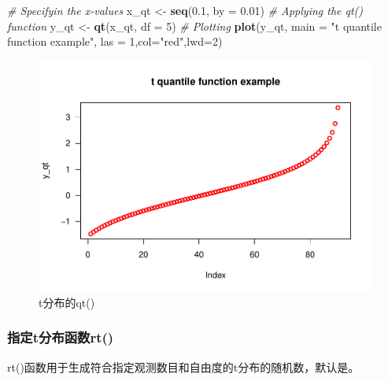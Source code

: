 \documentclass[
]{article}
\newenvironment{Shaded}{\begin{snugshade}}{\end{snugshade}}
\newcommand{\CommentTok}[1]{\textcolor[rgb]{0.56,0.35,0.01}{\textit{#1}}}
\newcommand{\DataTypeTok}[1]{\textcolor[rgb]{0.13,0.29,0.53}{#1}}
\newcommand{\DecValTok}[1]{\textcolor[rgb]{0.00,0.00,0.81}{#1}}
\newcommand{\FloatTok}[1]{\textcolor[rgb]{0.00,0.00,0.81}{#1}}
\newcommand{\KeywordTok}[1]{\textcolor[rgb]{0.13,0.29,0.53}{\textbf{#1}}}
\newcommand{\NormalTok}[1]{#1}
\newcommand{\StringTok}[1]{\textcolor[rgb]{0.31,0.60,0.02}{#1}}
\begin{document}
\begin{Shaded}
\begin{Highlighting}[]
\CommentTok{# Specifyin the x-values}
\NormalTok{x_qt <-}\StringTok{ }\KeywordTok{seq}\NormalTok{(}\FloatTok{0.1}\NormalTok{, }\DataTypeTok{by =} \FloatTok{0.01}\NormalTok{)}
\CommentTok{# Applying the qt() function}
\NormalTok{y_qt <-}\StringTok{ }\KeywordTok{qt}\NormalTok{(x_qt, }\DataTypeTok{df =} \DecValTok{5}\NormalTok{)}
\CommentTok{# Plotting}
\KeywordTok{plot}\NormalTok{(y_qt, }\DataTypeTok{main =} \StringTok{"t quantile function example"}\NormalTok{, }\DataTypeTok{las =} \DecValTok{1}\NormalTok{,}\DataTypeTok{col=}\StringTok{"red"}\NormalTok{,}\DataTypeTok{lwd=}\DecValTok{2}\NormalTok{)}
\end{Highlighting}
\end{Shaded}

\begin{figure}

{\centering \includegraphics[width=0.49\linewidth,height=0.49\textheight]{figs/qttest} 

}

\caption{t分布的qt()}\label{fig:qttest}
\end{figure}

\hypertarget{ux6307ux5b9atux5206ux5e03ux51fdux6570rt}{%
\subsubsection{指定t分布函数rt()}\label{ux6307ux5b9atux5206ux5e03ux51fdux6570rt}}

rt()函数用于生成符合指定观测数目和自由度的t分布的随机数，默认是。
\end{document}
